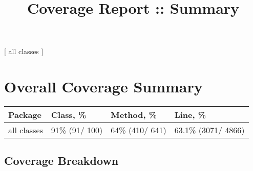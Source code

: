 \documentclass[
]{article}
\title{Coverage Report :: Summary}
\author{}
\date{}
\begin{document}
\maketitle

{[} all classes {]}

\hypertarget{overall-coverage-summary}{%
\section{Overall Coverage Summary}\label{overall-coverage-summary}}

\begin{longtable}[]{@{}llll@{}}
\toprule
Package & Class, \% & Method, \% & Line, \%\tabularnewline
\midrule
\endhead
all classes & { 91\% } { (91/ 100) } & { 64\% } { (410/ 641) } & {
63.1\% } { (3071/ 4866) }\tabularnewline
\bottomrule
\end{longtable}

\hfill\break

\hypertarget{coverage-breakdown}{%
\subsection{Coverage Breakdown}\label{coverage-breakdown}}
\end{document}
